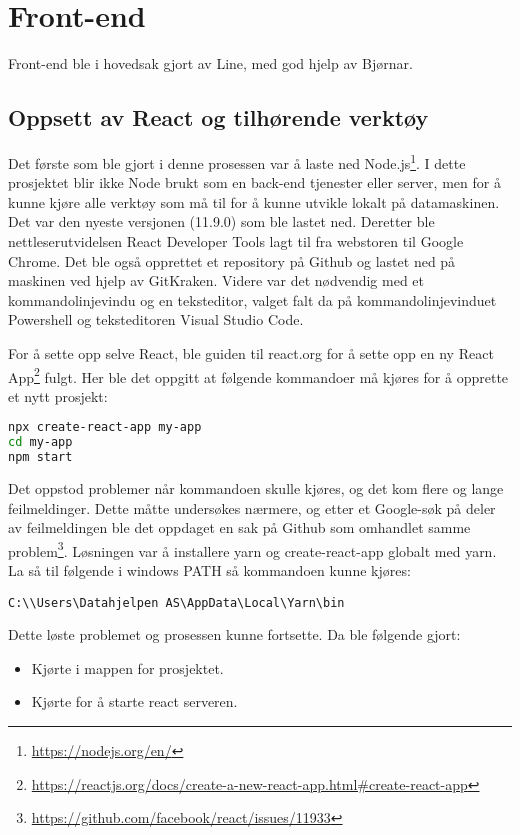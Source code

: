 \section{Front-end}
Front-end ble i hovedsak gjort av Line, med god hjelp av Bjørnar. 

\subsection{Oppsett av React og tilhørende verktøy}

Det første som ble gjort i denne prosessen var å laste ned Node.js\footnote{\url{https://nodejs.org/en/}}. I dette prosjektet blir ikke Node brukt som en back-end tjenester eller server, men for å kunne kjøre alle verktøy som må til for å kunne utvikle lokalt på datamaskinen. Det var den nyeste versjonen (11.9.0) som ble lastet ned. Deretter ble nettleserutvidelsen React Developer Tools lagt til fra  webstoren til Google Chrome. Det ble også opprettet et repository på Github og lastet ned på maskinen ved hjelp av GitKraken. 
Videre var det nødvendig med et kommandolinjevindu og en teksteditor, valget falt da på kommandolinjevinduet Powershell og teksteditoren Visual Studio Code.

For å sette opp selve React, ble  guiden til react.org for å sette opp en ny React App\footnote{\url{https://reactjs.org/docs/create-a-new-react-app.html\#create-react-app}} fulgt. Her ble det oppgitt at følgende kommandoer må kjøres for å opprette et nytt prosjekt:
\begin{lstlisting}[caption={Oppretting av React App},language=bash]
npx create-react-app my-app
cd my-app
npm start
\end{lstlisting}

Det oppstod problemer når kommandoen  skulle kjøres, og det kom flere og lange feilmeldinger. Dette måtte undersøkes nærmere, og etter et Google-søk på deler av feilmeldingen ble det oppdaget en sak på Github som omhandlet samme problem\footnote{\url{https://github.com/facebook/react/issues/11933}}.
Løsningen var å installere yarn og create-react-app globalt med yarn. La så til følgende i windows PATH så kommandoen kunne kjøres:
\begin{lstlisting}
C:\\Users\Datahjelpen AS\AppData\Local\Yarn\bin
\end{lstlisting}
Dette løste problemet og prosessen kunne fortsette. Da ble følgende gjort:

\begin{itemize}
\item Kjørte  i mappen for prosjektet.
\item Kjørte  for å starte react serveren.
\end{itemize}

